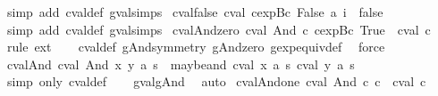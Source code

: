 \begin{isabellebody}
\endisadelimproof
%
\isatagproof
{}\isamarkupfalse%
\ {\isacharparenleft}simp\ add{\isacharcolon}\ cval{\isacharunderscore}def\ gval{\isachardot}simps{\isacharparenright}%
\endisatagproof
{\isafoldproof}%
%
\isadelimproof
\isanewline
%
\endisadelimproof
\isanewline
{}\isamarkupfalse%
\ cval{\isacharunderscore}false{\isacharcolon}\ {\isachardoublequoteopen}cval\ {\isacharparenleft}cexp{\isachardot}Bc\ False{\isacharparenright}\ a\ i\ {\isacharequal}\ false{\isachardoublequoteclose}\isanewline
%
\isadelimproof
\ \ %
\endisadelimproof
%
\isatagproof
{}\isamarkupfalse%
\ {\isacharparenleft}simp\ add{\isacharcolon}\ cval{\isacharunderscore}def\ gval{\isachardot}simps{\isacharparenright}%
\endisatagproof
{\isafoldproof}%
%
\isadelimproof
\isanewline
%
\endisadelimproof
\isanewline
{}\isamarkupfalse%
\ cval{\isacharunderscore}And{\isacharunderscore}zero{\isacharcolon}\ {\isachardoublequoteopen}cval\ {\isacharparenleft}And\ c\ {\isacharparenleft}cexp{\isachardot}Bc\ True{\isacharparenright}{\isacharparenright}\ {\isacharequal}\ cval\ c{\isachardoublequoteclose}\isanewline
%
\isadelimproof
\ \ %
\endisadelimproof
%
\isatagproof
{}\isamarkupfalse%
\ {\isacharparenleft}rule\ ext{\isacharparenright}{\isacharplus}\isanewline
\ \ \isamarkupfalse%
\ cval{\isacharunderscore}def\ gAnd{\isacharunderscore}symmetry\ gAnd{\isacharunderscore}zero\ gexp{\isacharunderscore}equiv{\isacharunderscore}def\ \isamarkupfalse%
\ force%
\endisatagproof
{\isafoldproof}%
%
\isadelimproof
\isanewline
%
\endisadelimproof
\isanewline
{}\isamarkupfalse%
\ cval{\isacharunderscore}And{\isacharcolon}\ {\isachardoublequoteopen}cval\ {\isacharparenleft}And\ x\ y{\isacharparenright}\ a\ s\ {\isacharequal}\ maybe{\isacharunderscore}and\ {\isacharparenleft}cval\ x\ a\ s{\isacharparenright}\ {\isacharparenleft}cval\ y\ a\ s{\isacharparenright}{\isachardoublequoteclose}\isanewline
%
\isadelimproof
\ \ %
\endisadelimproof
%
\isatagproof
{}\isamarkupfalse%
\ {\isacharparenleft}simp\ only{\isacharcolon}\ cval{\isacharunderscore}def{\isacharparenright}\isanewline
\ \ \isamarkupfalse%
\ gval{\isacharunderscore}gAnd\ \isamarkupfalse%
\ auto%
\endisatagproof
{\isafoldproof}%
%
\isadelimproof
\isanewline
%
\endisadelimproof
\isanewline
{}\isamarkupfalse%
\ cval{\isacharunderscore}And{\isacharunderscore}one{\isacharcolon}\ {\isachardoublequoteopen}cval\ {\isacharparenleft}And\ c\ c{\isacharparenright}\ {\isacharequal}\ cval\ c{\isachardoublequoteclose}\isanewline

\end{isabellebody}
